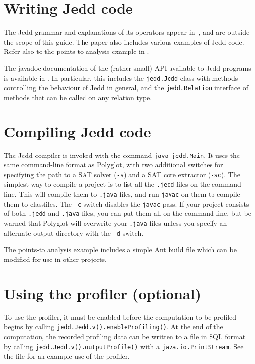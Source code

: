 \documentclass{article}
\begin{document}
\section{Writing Jedd code}
The Jedd grammar and explanations of its operators appear in~\cite{Lhotak:2004:JBR,Lhotak:2005:PAU},
and are outside the scope of this guide. The paper also includes various
examples of Jedd code. Refer also to the points-to analysis example in
.

The javadoc documentation of the (rather small) API available to Jedd programs
is available in . In particular, this includes the
{\tt jedd.Jedd} class with methods controlling the behaviour of Jedd in general,
and the {\tt jedd.Relation} interface of methods that can be called on any
relation type.

\section{Compiling Jedd code}
The Jedd compiler is invoked with the command {\tt java jedd.Main}.
It uses the same command-line format as Polyglot, with two additional
switches for specifying the path to a SAT solver ({\tt -s}) and a
SAT core extractor ({\tt -sc}). The simplest way to compile a project
is to list all the {\tt .jedd} files on the command line. This will
compile them to {\tt .java} files, and run {\tt javac} on them to
compile them to classfiles. The {\tt -c} switch disables the {\tt javac}
pass. If your project consists of both {\tt .jedd} and {\tt .java}
files, you can put them all on the command line, but be warned that
Polyglot will overwrite your {\tt .java} files unless you specify
an alternate output directory with the {\tt -d} switch.

The points-to analysis example includes a simple Ant build file
which can be modified for use in other projects.

\section{Using the profiler (optional)}
To use the profiler, it must be enabled before the computation to be profiled
begins by calling {\tt jedd.Jedd.v().enableProfiling()}. At the end of
the computation, the recorded profiling data can be written to a file
in SQL format by calling {\tt jedd.Jedd.v().outputProfile()} with a
{\tt java.io.PrintStream}. See the file 
for an example use of the profiler.
\end{document}
